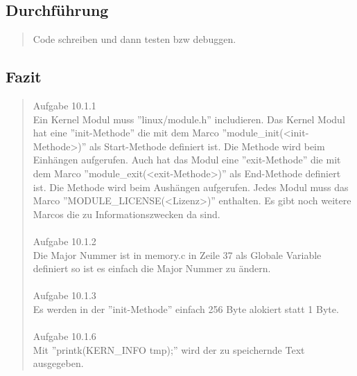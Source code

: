 	\subsection{Durchführung}
		\begin{quote}
			Code schreiben und dann testen bzw debuggen.\\
		\end{quote}
	\subsection{Fazit}
		\begin{quote}
			Aufgabe 10.1.1\\
			Ein Kernel Modul muss ''linux/module.h'' includieren. Das Kernel Modul hat eine ''init-Methode'' die mit dem Marco ''module\_init(<init-Methode>)'' als Start-Methode definiert ist. Die Methode wird beim Einh\"angen aufgerufen. Auch hat das Modul eine ''exit-Methode'' die mit dem Marco ''module\_exit(<exit-Methode>)'' als End-Methode definiert ist. Die Methode wird beim Aush\"angen aufgerufen. Jedes Modul muss das Marco
			''MODULE\_LICENSE(<Lizenz>)'' enthalten. Es gibt noch weitere Marcos die zu Informationszwecken da sind.\\ \\
			
			Aufgabe 10.1.2\\
			
			Die Major Nummer ist in memory.c in Zeile 37 als Globale Variable definiert so ist es einfach die Major Nummer zu \"andern.\\ \\
			
			Aufgabe 10.1.3\\
			
			Es werden in der ''init-Methode'' einfach 256 Byte alokiert statt 1 Byte.\\ \\
			
			Aufgabe 10.1.6\\
			
			Mit ''printk(KERN\_INFO tmp);'' wird der zu speichernde Text ausgegeben.\\
		\end{quote}